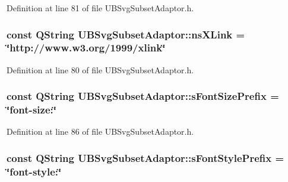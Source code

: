 Definition at line 81 of file U\-B\-Svg\-Subset\-Adaptor.\-h.

\hypertarget{class_u_b_svg_subset_adaptor_a9a1c2bd95b31f64b43fda8acc13e2a21}{
\subsubsection[{ns\-X\-Link}]{\setlength{\rightskip}{0pt plus 5cm}const Q\-String U\-B\-Svg\-Subset\-Adaptor\-::ns\-X\-Link = \char`\"{}http\-://www.\-w3.\-org/1999/xlink\char`\"{}\hspace{0.3cm}{\ttfamily [static]}}}\label{d3/df9/class_u_b_svg_subset_adaptor_a9a1c2bd95b31f64b43fda8acc13e2a21}


Definition at line 80 of file U\-B\-Svg\-Subset\-Adaptor.\-h.

\hypertarget{class_u_b_svg_subset_adaptor_ade20b66dff8586c2a270fc0ec0e37140}{
\subsubsection[{s\-Font\-Size\-Prefix}]{\setlength{\rightskip}{0pt plus 5cm}const Q\-String U\-B\-Svg\-Subset\-Adaptor\-::s\-Font\-Size\-Prefix = \char`\"{}font-\/size\-:\char`\"{}\hspace{0.3cm}{\ttfamily [static]}}}\label{d3/df9/class_u_b_svg_subset_adaptor_ade20b66dff8586c2a270fc0ec0e37140}


Definition at line 86 of file U\-B\-Svg\-Subset\-Adaptor.\-h.

\hypertarget{class_u_b_svg_subset_adaptor_a67a360fb9d747e9f3dc05022be5a6f29}{
\subsubsection[{s\-Font\-Style\-Prefix}]{\setlength{\rightskip}{0pt plus 5cm}const Q\-String U\-B\-Svg\-Subset\-Adaptor\-::s\-Font\-Style\-Prefix = \char`\"{}font-\/style\-:\char`\"{}\hspace{0.3cm}{\ttfamily [static]}}}\label{d3/df9/class_u_b_svg_subset_adaptor_a67a360fb9d747e9f3dc05022be5a6f29}



